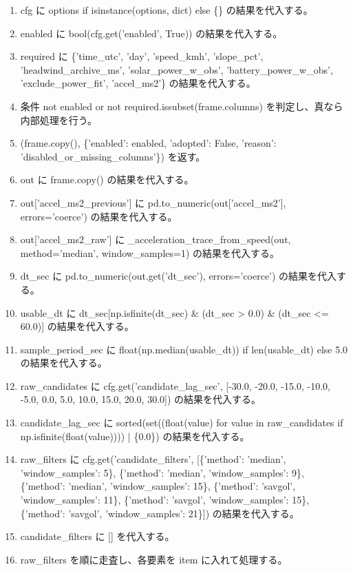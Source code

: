 \documentclass[a4paper,11pt]{article}
\begin{document}
            \begin{enumerate}[leftmargin=1.8em]
            \item cfg に options if isinstance(options, dict) else \{\} の結果を代入する。
\item enabled に bool(cfg.get('enabled', True)) の結果を代入する。
\item required に \{'time\_utc', 'day', 'speed\_kmh', 'slope\_pct', 'headwind\_archive\_ms', 'solar\_power\_w\_obs', 'battery\_power\_w\_obs', 'exclude\_power\_fit', 'accel\_ms2'\} の結果を代入する。
\item 条件 not enabled or not required.issubset(frame.columns) を判定し、真なら内部処理を行う。
\item   (frame.copy(), \{'enabled': enabled, 'adopted': False, 'reason': 'disabled\_or\_missing\_columns'\}) を返す。
\item out に frame.copy() の結果を代入する。
\item out['accel\_ms2\_previous'] に pd.to\_numeric(out['accel\_ms2'], errors='coerce') の結果を代入する。
\item out['accel\_ms2\_raw'] に \_acceleration\_trace\_from\_speed(out, method='median', window\_samples=1) の結果を代入する。
\item dt\_sec に pd.to\_numeric(out.get('dt\_sec'), errors='coerce') の結果を代入する。
\item usable\_dt に dt\_sec[np.isfinite(dt\_sec) \& (dt\_sec > 0.0) \& (dt\_sec <= 60.0)] の結果を代入する。
\item sample\_period\_sec に float(np.median(usable\_dt)) if len(usable\_dt) else 5.0 の結果を代入する。
\item raw\_candidates に cfg.get('candidate\_lag\_sec', [-30.0, -20.0, -15.0, -10.0, -5.0, 0.0, 5.0, 10.0, 15.0, 20.0, 30.0]) の結果を代入する。
\item candidate\_lag\_sec に sorted(set((float(value) for value in raw\_candidates if np.isfinite(float(value)))) | \{0.0\}) の結果を代入する。
\item raw\_filters に cfg.get('candidate\_filters', [\{'method': 'median', 'window\_samples': 5\}, \{'method': 'median', 'window\_samples': 9\}, \{'method': 'median', 'window\_samples': 15\}, \{'method': 'savgol', 'window\_samples': 11\}, \{'method': 'savgol', 'window\_samples': 15\}, \{'method': 'savgol', 'window\_samples': 21\}]) の結果を代入する。
\item candidate\_filters に [] を代入する。
\item raw\_filters を順に走査し、各要素を item に入れて処理する。

\end{enumerate}
\end{document}
